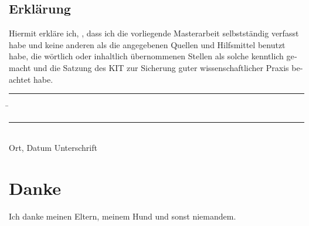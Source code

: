 \documentclass[12pt,a4paper,twoside,headings=openright]{scrreprt}
\begin{document}
\tableofcontents









\printbibliography

\begin{otherlanguage}{ngerman}
\chapter*{Erklärung}
\pagestyle{empty}

  \vspace{20mm}
  Hiermit erkläre ich, \theauthor, dass ich die vorliegende Masterarbeit selbst\-ständig
verfasst habe und keine anderen als die angegebenen Quellen und Hilfsmittel
benutzt habe, die wörtlich oder inhaltlich übernommenen Stellen als solche kenntlich gemacht und
die Satzung des KIT zur Sicherung guter wissenschaftlicher Praxis beachtet habe.
  \vspace{20mm}
  \begin{tabbing}
  \rule{4cm}{.4pt}\hspace{1cm} \= \rule{7cm}{.4pt} \\
 Ort, Datum \> Unterschrift
  \end{tabbing}
\end{otherlanguage}

\chapter*{Danke}
\pagestyle{empty}

Ich danke meinen Eltern, meinem Hund und sonst niemandem.

\pagestyle{fancy}
\appendix

%
\end{document}
